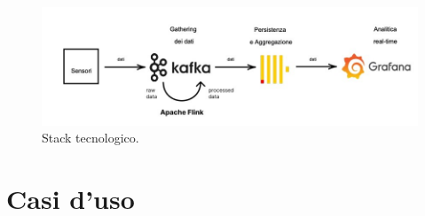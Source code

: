 \documentclass[8pt]{article}
\newcommand{\glossterm}[1]{#1\textsuperscript{G}} %
\begin{document}
\begin{figure}

\centering
\includegraphics[width=\linewidth]{image_adr/stack.jpg}
\caption{Stack tecnologico.}
\end{figure}
\newpage
\section{Casi d'uso} \label{sec:use-case}
\end{document}
